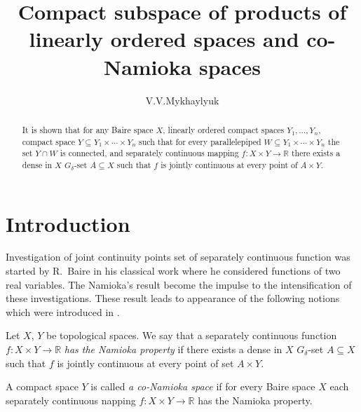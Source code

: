 \documentclass{amsart}
\begin{document}
\title{Compact subspace of products of linearly ordered spaces and co-Namioka spaces}

\author{V.V.Mykhaylyuk}
\address{Department of Mathematics\\
Chernivtsi National University\\ str. Kotsjubyn'skogo 2,
Chernivtsi, 58012 Ukraine}




\begin{abstract}
It is shown that for any Baire space $X$, linearly ordered compact spaces $Y_1,\dots, Y_n$, compact space $Y\subseteq Y_1\times\cdots \times Y_n$ such that for every parallelepiped $W\subseteq Y_1\times\cdots \times Y_n$ the set $Y\cap W$ is connected, and separately continuous mapping $f:X\times Y\to\mathbb R$ there exists a dense in $X$ $G_\delta$-set $A\subseteq X$ such that $f$ is jointly  continuous at every point of $A\times Y$.
\end{abstract}

\maketitle
\section{Introduction}

Investigation of joint continuity points set of separately continuous function was started by R.~Baire in his classical work \cite{Baire} where he considered functions of two real variables.  The Namioka's result \cite{N} become the impulse to the intensification of these investigations. These result leads to appearance of the following notions which were introduced in \cite{D}.

Let $X$, $Y$ be topological spaces. We say that a separately continuous function $f:X\times Y\to \mathbb R$ {\it has the Namioka property} if there exists a dense in $X$ $G_\delta$-set $A\subseteq X$ such that $f$ is jointly continuous at every point of set $A\times Y$.

A compact space $Y$ is called {\it a co-Namioka space} if for every Baire space $X$ each separately continuous napping $f:X\times Y\to \mathbb R$ has the Namioka property.
\end{document}
